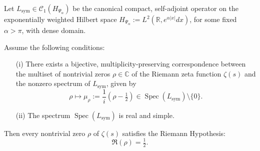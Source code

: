 \begin{lemma}
\label{lem:inject_zero_real_spectrum}
Let \( L_{\mathrm{sym}} \in \mathcal{C}_1(H_{\Psi_\alpha}) \) be the canonical compact, self-adjoint operator on the exponentially weighted Hilbert space \( H_{\Psi_\alpha} := L^2(\mathbb{R}, e^{\alpha |x|} dx) \), for some fixed \( \alpha > \pi \), with dense domain.

Assume the following conditions:
\begin{enumerate}
  \item[\textnormal{(i)}] There exists a bijective, multiplicity-preserving correspondence between the multiset of nontrivial zeros \( \rho \in \mathbb{C} \) of the Riemann zeta function \( \zeta(s) \) and the nonzero spectrum of \( L_{\mathrm{sym}} \), given by
  \[
  \rho \mapsto \mu_\rho := \frac{1}{i}(\rho - \tfrac{1}{2}) \in \operatorname{Spec}(L_{\mathrm{sym}}) \setminus \{0\}.
  \]
  
  \item[\textnormal{(ii)}] The spectrum \( \operatorname{Spec}(L_{\mathrm{sym}}) \) is real and simple.
\end{enumerate}

Then every nontrivial zero \( \rho \) of \( \zeta(s) \) satisfies the Riemann Hypothesis:
\[
\Re(\rho) = \tfrac{1}{2}.
\]
\end{lemma}
